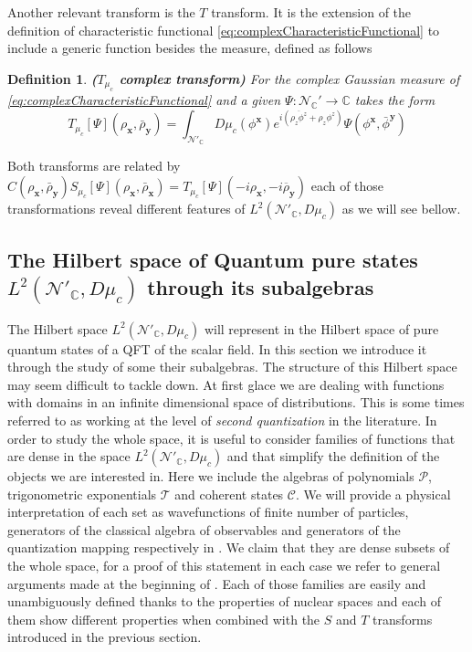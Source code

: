 \documentclass{elsarticle}%
\newtheorem{definition}{Definition}%
\begin{document}
Another relevant transform is the $T$ transform. It is the  extension of  the definition of characteristic functional \eqref{eq:complexCharacteristicFunctional} to  include a generic function besides the measure, defined as follows
\begin{definition}
    \label{def:TComplextransform}{\bf ($T_{\mu_c}$ complex transform)} For the complex Gaussian measure of \eqref{eq:complexCharacteristicFunctional} and a given $\Psi:\mathcal{N}_{\mathbb{C}}'\to \mathbb{C}$  takes the form 
\begin{equation}
    \label{eq:Ttransform}
    T_{\mu_c}[\Psi](\rho_\mathbf{x},\bar{\rho}_\mathbf{y})=\int_{\mathcal{N}'_\mathbb{C}}D\mu_c(\phi^{\mathbf{x}})e^{i(\overline{\rho_z\phi^z}+\rho_z\phi^z)} \Psi(\phi^{\mathbf{x}},\bar\phi^\mathbf{y})
    \end{equation}
\end{definition}

\noindent Both transforms are related by $C(\rho_\mathbf{x},\bar{\rho}_\mathbf{y}) S_{\mu_c}[\Psi](\rho_\mathbf{x},\bar\rho_\mathbf{x})= T_{\mu_c}[\Psi](-i\rho_\mathbf{x},-i\overline{\rho}_\mathbf{y})$ each of those transformations reveal  different features of $L^2(\mathcal{N}'_\mathbb{C},D\mu_c)$ as we will see bellow.  


\subsection{The Hilbert space of Quantum pure states  $L^2(\mathcal{N}'_\mathbb{C},D\mu_c)$ through its subalgebras}
\label{sec:algebras}


The Hilbert space $L^2(\mathcal{N}'_\mathbb{C},D\mu_c)$ will represent in \cite{alonsoGeometricFlavours2024} the Hilbert space of pure quantum states of a {QFT} of the scalar field. In this section we introduce it through the study of some their subalgebras. 
The structure of this  Hilbert space  may seem difficult to tackle down. At first glace we are dealing with functions with domains in an infinite dimensional space of distributions. This is some times referred to as working at the level of {\it second quantization} in the literature. In order to study the whole space, it is useful to consider  families of functions that are dense in the space $L^2(\mathcal{N}'_\mathbb{C},D\mu_c)$ and that simplify the definition of the objects we are interested in. Here we include the algebras of polynomials $\mathcal{P}$, trigonometric exponentials $\mathcal{T}$ and coherent states $\mathcal{C}$.  We will provide a physical interpretation of each set as wavefunctions of finite number of particles, generators of the classical algebra of observables and generators of the quantization mapping respectively in \cite{alonsoGeometricFlavours2024}. We claim that they are dense subsets of the whole space, for a proof of this statement in each case we refer to general arguments made at the beginning of  \cite{hidaWhiteNoise1993}. Each of those families are easily and unambiguously defined thanks to the properties of nuclear spaces and each of them show different properties when combined with the $S$ and $T$ transforms introduced in the previous section. 
\end{document}
